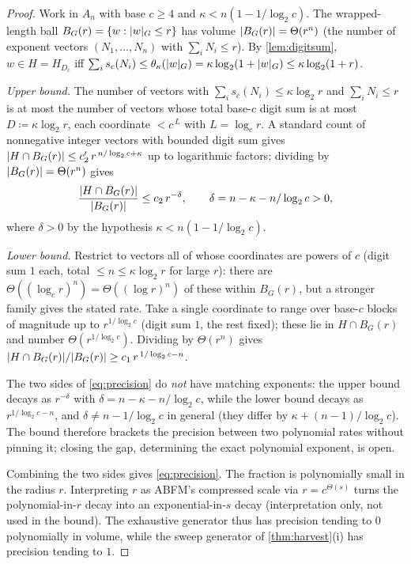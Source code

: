 \documentclass[11pt]{article}
\numberwithin{equation}{section}
\newcommand{\defeq}{\coloneqq}
\DeclarePairedDelimiter{\abs}{\lvert}{\rvert}
\newcommand{\Comp}[1]{H_{#1}}
\theoremstyle{plain}
\theoremstyle{definition}
\theoremstyle{remark}
\begin{document}
\begin{statementbox}
\PropPrecision*
\end{statementbox}
\begin{proof}
Work in $A_n$ with base $c \ge 4$ and $\kappa < n(1 - 1/\log_2 c)$. The wrapped-length ball
$B_G(r) = \{ w : \abs{w}_G \le r \}$ has volume $\abs{B_G(r)} = \Theta(r^n)$ (the number of
exponent vectors $(N_1, \dots, N_n)$ with $\sum_i N_i \le r$). By \cref{lem:digitsum}, $w \in
H = \Comp{D_c}$ iff $\sum_i s_c(N_i) \le \theta_\kappa(\abs{w}_G) = \kappa \log_2(1 +
\abs{w}_G) \le \kappa \log_2(1 + r)$.

\emph{Upper bound.} The number of vectors with $\sum_i s_c(N_i) \le \kappa \log_2 r$ and
$\sum_i N_i \le r$ is at most the number of vectors whose total base-$c$ digit sum is at most
$D \defeq \kappa \log_2 r$, each coordinate $< c^{\,L}$ with $L = \log_c r$. A standard count
of nonnegative integer vectors with bounded digit sum gives $\abs{H \cap B_G(r)} \le c_2'\,
r^{\,n/\log_2 c + \kappa}$ up to logarithmic factors; dividing by $\abs{B_G(r)} = \Theta(r^n)$
gives
\begin{equation*}
  \frac{\abs{H \cap B_G(r)}}{\abs{B_G(r)}} \le c_2\, r^{-\delta},
  \qquad \delta = n - \kappa - n/\log_2 c > 0,
\end{equation*}
where $\delta > 0$ by the hypothesis $\kappa < n(1 - 1/\log_2 c)$.

\emph{Lower bound.} Restrict to vectors all of whose coordinates are powers of $c$ (digit sum
$1$ each, total $\le n \le \kappa \log_2 r$ for large $r$): there are $\Theta((\log_c r)^n) =
\Theta((\log r)^n)$ of these within $B_G(r)$, but a stronger family gives the stated rate.
Take a single coordinate to range over base-$c$ blocks of magnitude up to $r^{1/\log_2 c}$
(digit sum $1$, the rest fixed); these lie in $H \cap B_G(r)$ and number $\Theta(r^{1/\log_2
c})$. Dividing by $\Theta(r^n)$ gives $\abs{H \cap B_G(r)}/\abs{B_G(r)} \ge c_1\,
r^{\,1/\log_2 c - n}$.

The two sides of \eqref{eq:precision} do \emph{not} have matching exponents: the upper bound
decays as $r^{-\delta}$ with $\delta = n - \kappa - n/\log_2 c$, while the lower bound decays
as $r^{1/\log_2 c - n}$, and $\delta \ne n - 1/\log_2 c$ in general (they differ by $\kappa +
(n-1)/\log_2 c$). The bound therefore brackets the precision between two polynomial rates
without pinning it; closing the gap, determining the exact polynomial exponent, is open.

Combining the two sides gives \eqref{eq:precision}. The fraction is polynomially small in the
radius $r$. Interpreting $r$ as ABFM's compressed scale via $r = c^{\Theta(s)}$ turns the
polynomial-in-$r$ decay into an exponential-in-$s$ decay (interpretation only, not used in the
bound). The exhaustive generator thus has precision tending to $0$ polynomially in volume,
while the sweep generator of \cref{thm:harvest}(i) has precision tending to $1$.
\end{proof}
\end{document}
